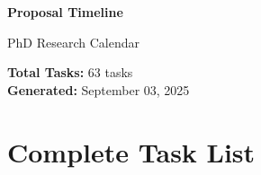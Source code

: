 \documentclass[landscape,a4paper]{article}
\begin{document}
\begin{titlepage}
\centering
\vspace*{2cm}

{\LARGE\textbf{Proposal Timeline}}

\vspace{1cm}
{\large PhD Research Calendar}

\vspace{2cm}

\begin{minipage}{0.9\textwidth}
\centering
\textbf{Total Tasks:} 63 tasks\\
\textbf{Generated:} September 03, 2025
\end{minipage}

\vfill

\end{titlepage}

\newpage

\section{Complete Task List}
\vspace{0.5cm}
\end{document}
